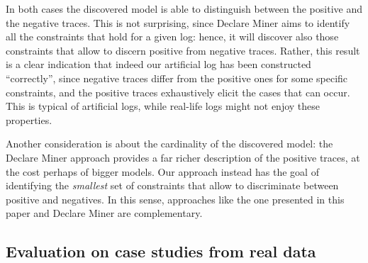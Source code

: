 In both cases the discovered model is able to distinguish between the positive and the negative traces. This is not surprising, since Declare Miner aims to identify all the constraints that hold for a given log: hence, it will discover also those constraints that allow to discern positive from negative traces. Rather, this result is a clear indication that indeed our artificial log has been constructed ``correctly'', since negative traces differ from the positive ones for some specific constraints, and the positive traces exhaustively elicit the cases that can occur. 
This is typical of artificial logs, while real-life logs might not enjoy these properties.

Another consideration is about the cardinality of the discovered model: the Declare Miner approach provides a far richer description of the positive traces, at the cost perhaps of bigger models. Our approach instead has the goal of identifying the \emph{smallest} set of constraints that allow to discriminate between positive and negatives. In this sense, approaches like the one presented in this paper and Declare Miner are complementary.




\subsection{Evaluation on case studies from real data}
\label{sec:realdata}


